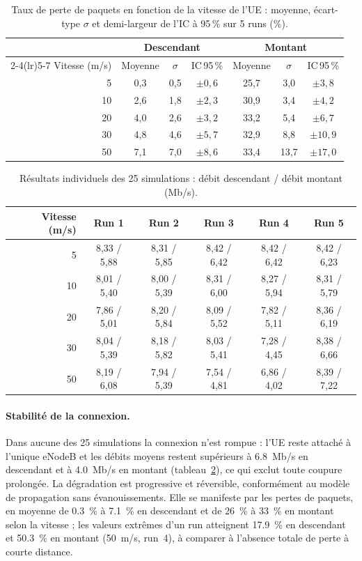 \begin{table}[H]
\centering
\caption{Taux de perte de paquets en fonction de la vitesse de l'UE : moyenne,
écart-type $\sigma$ et demi-largeur de l'IC à 95\,\% sur 5 runs (\%).}
\label{tab:A-q5-pertes}
\small
\begin{tabular}{rcccccc}
\toprule
 & \multicolumn{3}{c}{Descendant} & \multicolumn{3}{c}{Montant} \\
\cmidrule(lr){2-4}\cmidrule(lr){5-7}
Vitesse (m/s) & Moyenne & $\sigma$ & IC\,95\,\% & Moyenne & $\sigma$ & IC\,95\,\% \\
\midrule
5  & 0,3 & 0,5 & $\pm 0{,}6$ & 25,7 & 3,0  & $\pm 3{,}8$ \\
10 & 2,6 & 1,8 & $\pm 2{,}3$ & 30,9 & 3,4  & $\pm 4{,}2$ \\
20 & 4,0 & 2,6 & $\pm 3{,}2$ & 33,2 & 5,4  & $\pm 6{,}7$ \\
30 & 4,8 & 4,6 & $\pm 5{,}7$ & 32,9 & 8,8  & $\pm 10{,}9$ \\
50 & 7,1 & 7,0 & $\pm 8{,}6$ & 33,4 & 13,7 & $\pm 17{,}0$ \\
\bottomrule
\end{tabular}
\end{table}

\begin{table}[H]
\centering
\caption{Résultats individuels des 25 simulations : débit descendant / débit
montant (Mb/s).}
\label{tab:A-q5-runs}
\footnotesize
\begin{tabular}{rccccc}
\toprule
Vitesse (m/s) & Run 1 & Run 2 & Run 3 & Run 4 & Run 5 \\
\midrule
5  & 8,33 / 5,88 & 8,31 / 5,85 & 8,42 / 6,42 & 8,42 / 6,42 & 8,42 / 6,23 \\
10 & 8,01 / 5,40 & 8,00 / 5,39 & 8,31 / 6,00 & 8,27 / 5,94 & 8,31 / 5,79 \\
20 & 7,86 / 5,01 & 8,20 / 5,84 & 8,09 / 5,52 & 7,82 / 5,11 & 8,36 / 6,19 \\
30 & 8,04 / 5,39 & 8,18 / 5,82 & 8,03 / 5,41 & 7,28 / 4,45 & 8,38 / 6,66 \\
50 & 8,19 / 6,08 & 7,94 / 5,39 & 7,54 / 4,81 & 6,86 / 4,02 & 8,39 / 7,22 \\
\bottomrule
\end{tabular}
\end{table}

\paragraph{Stabilité de la connexion.} Dans aucune des 25 simulations la
connexion n'est rompue : l'UE reste attaché à l'unique eNodeB et les débits
moyens restent supérieurs à \SI{6.8}{Mb/s} en descendant et à \SI{4.0}{Mb/s}
en montant (tableau~\ref{tab:A-q5-runs}), ce qui exclut toute coupure
prolongée. La dégradation est progressive et réversible, conformément au
modèle de propagation sans évanouissements. Elle se manifeste par les pertes de
paquets, en moyenne de \SI{0.3}{\%} à \SI{7.1}{\%} en descendant et de
\SI{26}{\%} à \SI{33}{\%} en montant selon la vitesse ; les valeurs extrêmes
d'un run atteignent \SI{17.9}{\%} en descendant et \SI{50.3}{\%} en montant
(\SI{50}{m/s}, run~4), à comparer à l'absence totale de perte à courte distance.

